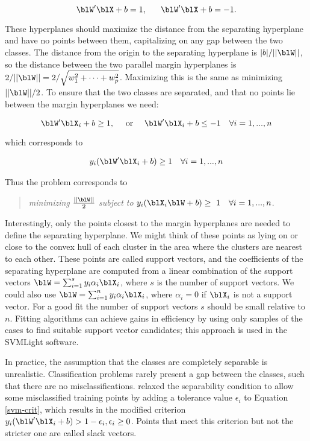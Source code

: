 \[
\blW'\blX + b = 1, ~~~~~ \blW'\blX + b = -1.
\]

\noindent These hyperplanes should maximize the distance from the
separating hyperplane and have no points between them, capitalizing on
any gap between the two classes. The distance from the origin to the
separating hyperplane is $|b|/||\blW||$, so the distance between the
two parallel margin hyperplanes is $2/||\blW||=2/\sqrt{w_1^2+\dots
+w_p^2}$. Maximizing this is the same as minimizing $||\blW||/2$. To
ensure that the two classes are separated, and that no points lie
between the margin hyperplanes we need:

\[
\blW'\blX_i + b \geq 1, ~~~\mbox{  or  } ~~~\blW'\blX_i + b \leq -1 ~~~\forall i=1, ..., n
\]

\noindent which corresponds to

\begin{eqnarray}
y_i(\blW'\blX_i+b)\geq 1 ~~~\forall i=1, ..., n
\label{svm-crit}
\end{eqnarray}

\noindent Thus the problem corresponds to
\begin{quote} 
{\em minimizing} $\frac{||\blW||}{2}$ {\em subject to }
$y_i(\blX_i\blW+b)\geq~1 ~~~\forall i=1, ..., n$.
\end{quote}


\noindent Interestingly, only the points closest to the margin
hyperplanes are needed to define the separating hyperplane. We might
think of these points as lying on or close to the convex hull of each
cluster in the area where the clusters are nearest to each other.
These points are called support vectors, and the coefficients of the
separating hyperplane are computed from a linear combination of the
support vectors $\blW = \sum_{i=1}^{s} y_i\alpha_i\blX_i$, where $s$
is the number of support vectors.  We could also use $\blW =
\sum_{i=1}^n y_i\alpha_i\blX_i$, where $\alpha_i=0$ if $\blX_i$ is not
a support vector. For a good fit the number of support vectors $s$
should be small relative to $n$. Fitting algorithms can achieve gains
in efficiency by using only samples of the cases to find suitable
support vector candidates; this approach is used in the SVMLight
\cite{Jo99} software.

In practice, the assumption that the classes are completely separable
is unrealistic. Classification problems rarely present a gap between
the classes, such that there are no misclassifications.
 relaxed the separability condition to allow some
misclassified training points by adding a tolerance value $\epsilon_i$
to Equation \ref{svm-crit}, which results in the modified criterion
$y_i(\blW'\blX_i+b)>1-\epsilon_i, \epsilon_i\geq 0$. Points that meet
this criterion but not the stricter one are called slack vectors.


